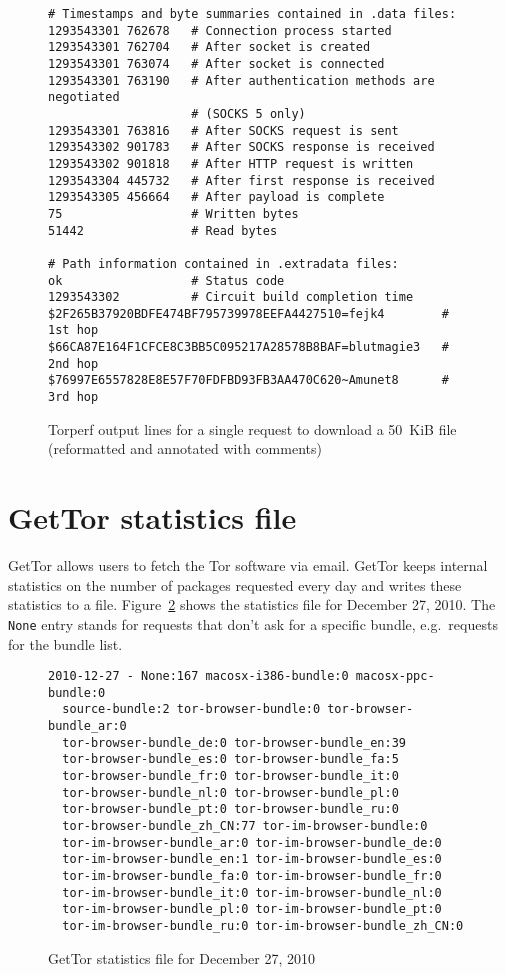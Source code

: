\documentclass{article}
\begin{document}
\begin{figure}
\begin{verbatim}
# Timestamps and byte summaries contained in .data files:
1293543301 762678   # Connection process started
1293543301 762704   # After socket is created
1293543301 763074   # After socket is connected
1293543301 763190   # After authentication methods are negotiated
                    # (SOCKS 5 only)
1293543301 763816   # After SOCKS request is sent
1293543302 901783   # After SOCKS response is received
1293543302 901818   # After HTTP request is written
1293543304 445732   # After first response is received
1293543305 456664   # After payload is complete
75                  # Written bytes
51442               # Read bytes

# Path information contained in .extradata files:
ok                  # Status code
1293543302          # Circuit build completion time
$2F265B37920BDFE474BF795739978EEFA4427510=fejk4        # 1st hop
$66CA87E164F1CFCE8C3BB5C095217A28578B8BAF=blutmagie3   # 2nd hop
$76997E6557828E8E57F70FDFBD93FB3AA470C620~Amunet8      # 3rd hop
\end{verbatim}
\vspace{-1em}
\caption{Torperf output lines for a single request to download a 50~KiB
file (reformatted and annotated with comments)}
\label{fig:torperf}
\end{figure}

\section{GetTor statistics file}

GetTor allows users to fetch the Tor software via email.
GetTor keeps internal statistics on the number of packages requested
every day and writes these statistics to a file.
Figure~\ref{fig:gettor} shows the statistics file for December 27, 2010.
The \verb+None+ entry stands for requests that don't ask for a specific
bundle, e.g.\ requests for the bundle list.

\begin{figure}
\begin{verbatim}
2010-12-27 - None:167 macosx-i386-bundle:0 macosx-ppc-bundle:0
  source-bundle:2 tor-browser-bundle:0 tor-browser-bundle_ar:0
  tor-browser-bundle_de:0 tor-browser-bundle_en:39
  tor-browser-bundle_es:0 tor-browser-bundle_fa:5
  tor-browser-bundle_fr:0 tor-browser-bundle_it:0
  tor-browser-bundle_nl:0 tor-browser-bundle_pl:0
  tor-browser-bundle_pt:0 tor-browser-bundle_ru:0
  tor-browser-bundle_zh_CN:77 tor-im-browser-bundle:0
  tor-im-browser-bundle_ar:0 tor-im-browser-bundle_de:0
  tor-im-browser-bundle_en:1 tor-im-browser-bundle_es:0
  tor-im-browser-bundle_fa:0 tor-im-browser-bundle_fr:0
  tor-im-browser-bundle_it:0 tor-im-browser-bundle_nl:0
  tor-im-browser-bundle_pl:0 tor-im-browser-bundle_pt:0
  tor-im-browser-bundle_ru:0 tor-im-browser-bundle_zh_CN:0
\end{verbatim}
\vspace{-1em}
\caption{GetTor statistics file for December 27, 2010}
\label{fig:gettor}
\end{figure}
\end{document}
